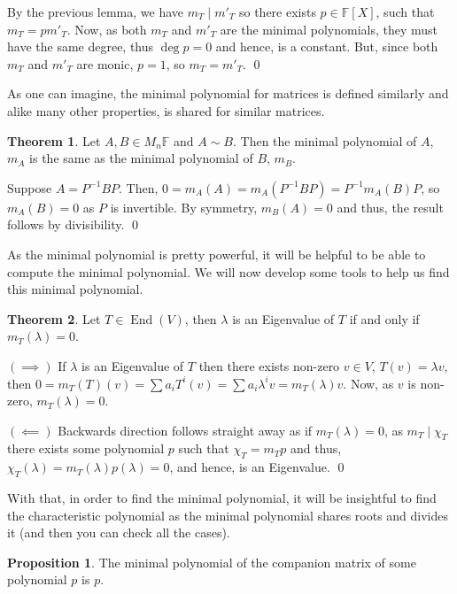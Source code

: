 \documentclass[
]{article}
\theoremstyle{definition}
\newtheorem{theorem}{Theorem}
\newtheorem{prop}{Proposition}[section]
\theoremstyle{definition}
\begin{document}
By the previous lemma, we have \(m_T \mid m'_T\) so there exists
\(p \in \mathbb{F}[X]\), such that \(m_T = p m'_T\). Now, as both
\(m_T\) and \(m'_T\) are the minimal polynomials, they must have the
same degree, thus \(\deg p = 0\) and hence, is a constant. But, since
both \(m_T\) and \(m'_T\) are monic, \(p = 1\), so \(m_T = m'_T\). \qed

As one can imagine, the minimal polynomial for matrices is defined
similarly and alike many other properties, is shared for similar
matrices.

\begin{theorem}
  Let \(A, B \in M_n{\mathbb{F}}\) and \(A \sim B\). Then the minimal polynomial 
  of \(A\), \(m_A\) is the same as the minimal polynomial of \(B\), \(m_B\).
\end{theorem}
\proof

Suppose \(A = P^{-1} B P\). Then,
\(0 = m_A(A) = m_A(P^{-1}BP) = P^{-1} m_A(B) P\), so \(m_A(B) = 0\) as
\(P\) is invertible. By symmetry, \(m_B(A) = 0\) and thus, the result
follows by divisibility. \qed

As the minimal polynomial is pretty powerful, it will be helpful to be
able to compute the minimal polynomial. We will now develop some tools
to help us find this minimal polynomial.

\begin{theorem}
  Let \(T \in \mathop{\mathrm{End}}(V)\), then \(\lambda\) is an Eigenvalue of \(T\) if and only 
  if \(m_T(\lambda) = 0\).
\end{theorem}
\proof

\((\implies)\) If \(\lambda\) is an Eigenvalue of \(T\) then there
exists non-zero \(v \in V\), \(T(v) = \lambda v\), then
\(0 = m_T(T)(v) = \sum a_i T^i(v) = \sum a_i \lambda^i v = m_T(\lambda)v\).
Now, as \(v\) is non-zero, \(m_T(\lambda) = 0\).

\((\impliedby)\) Backwards direction follows straight away as if
\(m_T(\lambda) = 0\), as \(m_T \mid \chi_T\) there exists some
polynomial \(p\) such that \(\chi_T = m_T p\) and thus,
\(\chi_T(\lambda)  = m_T(\lambda)p(\lambda) = 0\), and hence, is an
Eigenvalue. \qed

With that, in order to find the minimal polynomial, it will be
insightful to find the characteristic polynomial as the minimal
polynomial shares roots and divides it (and then you can check all the
cases).

\begin{prop}\label{comp_min}
  The minimal polynomial of the companion matrix of some polynomial \(p\) is \(p\).
\end{prop}
\end{document}
